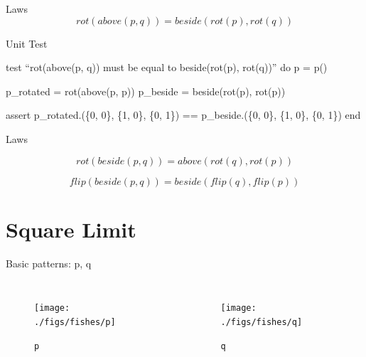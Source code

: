 \documentclass{beamer}
\begin{document}
\begin{frame}[fragile]{Laws}
  \begin{equation*}
  rot(above(p, q)) = beside(rot(p), rot(q))
  \end{equation*}

\begin{exampleblock}{Unit Test}
\begin{semiverbatim}
\tiny
\alert{test} {\color{gray}``rot(above(p, q)) must be equal to beside(rot(p), rot(q))''} \alert{do}
 p {\color{magenta}=} p()

 p\_rotated {\color{magenta}=} rot(above(p, p))
 p\_beside {\color{magenta}=} beside(rot(p), rot(p))

 assert
   p\_rotated{\color{magenta}.}(\{0, 0\}, \{1, 0\}, \{0, 1\}) {\color{magenta}==} p\_beside{\color{magenta}.}(\{0, 0\}, \{1, 0\}, \{0, 1\})
\alert{end}
\end{semiverbatim}
\end{exampleblock}
\end{frame}

\begin{frame}[fragile]{Laws}

  \begin{equation*}
  rot(beside(p, q)) = above(rot(q), rot(p))
  \end{equation*}

  \begin{equation*}
  flip(beside(p, q)) = beside(flip(q), flip(p))
  \end{equation*}
\end{frame}

    \section{Square Limit}

    \begin{frame}{Basic patterns: p, q}

        \begin{columns}[T,onlytextwidth]
                \begin{figure}
                    \centering
                    \texttt{[image: ./figs/fishes/p]}
                    \caption{\texttt{p}\label{fig:p}}
                \end{figure}

                \begin{figure}
                    \centering
                    \texttt{[image: ./figs/fishes/q]}
                    \caption{\texttt{q}\label{fig:q}}
                \end{figure}

        \end{columns}

    \end{frame}
\end{document}
